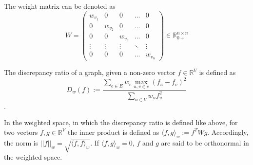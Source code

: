 The weight matrix can be denoted as $$ W = 
\begin{pmatrix}
w_{v_1} & 0 & 0&\dots &0 \\
0 & w_{v_2} & 0 & \ldots & 0 \\
0 & 0 & w_{v_3} & \ldots & 0 \\
\vdots & \vdots & \vdots & \ddots & \vdots \\
0 &0&0& \ldots  & w_{v_n}
\end{pmatrix} \in \mathbb{R}_{0+}^{n \times n} $$

The discrepancy ratio of a graph, given a non-zero vector $f \in \mathbb{R}^V$ is defined as $$D_w(f) := \frac{\sum_{e\in E} w_e \max_{u,v\in e}(f_u - f_v)^2}{\sum_{u\in V} w_u f_u^2}$$.

In the weighted space, in which the discrepancy ratio is defined like above, for two vectors $f, g \in \mathbb{R}^V$ the inner product is defined as $ \langle f,g \rangle_w := f^T W g$. Accordingly, the norm is $||f||_w = \sqrt{ \langle f,f \rangle_w}$.
If $ \langle f,g \rangle_w   = 0 $, $f$ and $g$ are said to be orthonormal in the weighted space.


